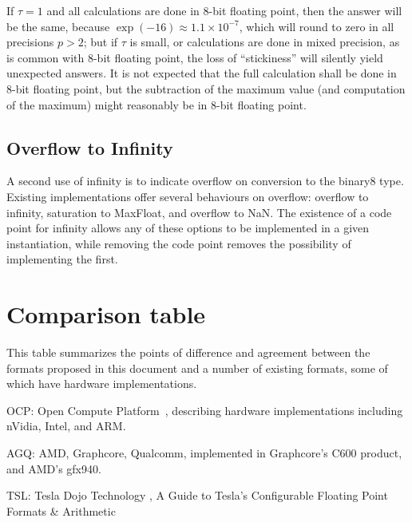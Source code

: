\documentclass{article}
\begin{document}
If $\tau=1$ and all calculations are done in 8-bit floating point, then the answer will be the same, because $\exp(-16) \approx 1.1 \times 10^{-7}$, which will round to zero in all precisions $p>2$;
but if $\tau$ is small, or calculations are done in mixed precision, as is common with 8-bit floating point, the loss of ``stickiness'' will silently yield unexpected answers.
It is not expected that the full calculation shall be done in 8-bit floating point, but the subtraction of the maximum value (and computation of the maximum) might reasonably be in 8-bit floating point.

\subsection{Overflow to Infinity}

A second use of infinity is to indicate overflow on conversion to the binary8 type.  Existing implementations offer several behaviours on overflow: overflow to infinity, saturation to MaxFloat, and overflow to NaN.  The existence of a code point for infinity allows any of these options to be implemented in a given instantiation, while removing the code point removes the possibility of implementing the first.

\clearpage
\section{Comparison table}
This table summarizes the points of difference and agreement between the formats proposed in this document and a number of existing formats, some of which have hardware implementations.

OCP: Open Compute Platform~\cite{ocp}, describing hardware implementations including nVidia, Intel, and ARM.

AGQ: AMD, Graphcore, Qualcomm\cite{agq}, implemented in Graphcore’s C600 product, and AMD’s gfx940.

TSL: Tesla Dojo Technology \cite{dojo}, A Guide to Tesla’s Configurable Floating Point Formats \& Arithmetic 
\end{document}
